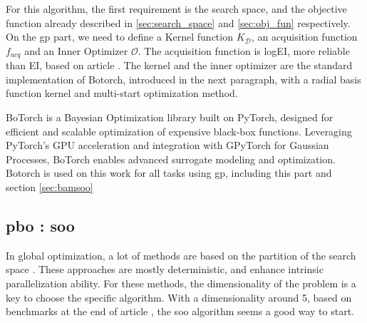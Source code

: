 For this algorithm, the first requirement is the search space, and the objective function already described in \ref{sec:search_space} and \ref{sec:obj_fun} respectively. On the \acrshort{gp} part, we need to define a Kernel function $K_\mathcal D$, an acquisition function $f_{acq}$ and an Inner Optimizer $\mathcal O$. The acquisition function is logEI, more reliable than EI, based on article \cite{ament_unexpected_2024}. The kernel and the inner optimizer are the standard implementation of Botorch, introduced in the next paragraph, with a radial basis function kernel and multi-start optimization method. 

BoTorch \cite{balandat_botorch_2020} is a Bayesian Optimization library built on PyTorch, designed for efficient and scalable optimization of expensive black-box functions. Leveraging PyTorch's GPU acceleration and integration with GPyTorch \cite{gardner_gpytorch_2021} for Gaussian Processes, BoTorch enables advanced surrogate modeling and optimization. Botorch is used on this work for all tasks using \acrshort{gp}, including this part and section \ref{sec:bamsoo}


\subsection{\acrlong{pbo} : \acrfull{soo}}
\label{sec:soo}
In global optimization, a lot of methods are based on the partition of the search space \cite{nakib_deterministic_2017,jones_lipschitzian_1993,munos_optimistic_2011}. These approaches are mostly deterministic, and enhance intrinsic parallelization ability. For these methods, the dimensionality of the problem is a key to choose the specific algorithm. With a dimensionality around 5, based on benchmarks at the end of article \cite{firmin_fractal-based_2022}, the \acrfull{soo} \cite{munos_optimistic_2011} algorithm seems a good way to start. 

